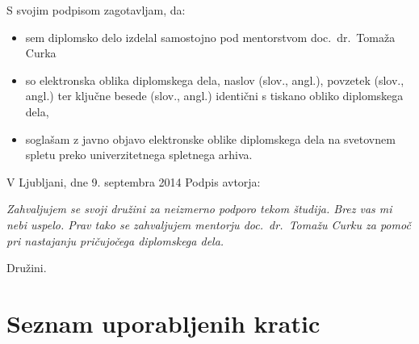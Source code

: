 \documentclass[a4paper, 12pt]{book}
\newcommand{\clearemptydoublepage}{\newpage{\pagestyle{empty}\cleardoublepage}}
\begin{document}
\vspace{1.5cm}
\noindent S svojim podpisom zagotavljam, da:
\begin{itemize}
	\item sem diplomsko delo izdelal samostojno pod mentorstvom
		doc.\ dr.\ Tomaža Curka

	\item	so elektronska oblika diplomskega dela, naslov (slov., angl.), povzetek (slov., angl.) ter ključne besede (slov., angl.) identični s tiskano obliko diplomskega dela,
	\item soglašam z javno objavo elektronske oblike diplomskega dela na svetovnem spletu preko univerzitetnega spletnega arhiva.	
\end{itemize}

\vspace{1cm}
\noindent V Ljubljani, dne 9. septembra 2014 \hfill Podpis avtorja:

\clearemptydoublepage

\thispagestyle{empty}\mbox{}\vfill\null\it%
Zahvaljujem se svoji družini za neizmerno podporo tekom študija. Brez vas mi
nebi uspelo. Prav tako se zahvaljujem mentorju doc.\ dr.\ Tomažu Curku za 
pomoč pri nastajanju pričujočega diplomskega dela. 
\rm\normalfont

\clearemptydoublepage

\thispagestyle{empty}\mbox{}{\textheight}\mbox{}\hfill\begin{minipage}{0.55\textwidth}%
Družini.
\normalfont\end{minipage}

\clearemptydoublepage

\def\thepage{}%
\setcounter{tocdepth}{3}
\tableofcontents{}


\clearemptydoublepage


\chapter*{Seznam uporabljenih kratic}
\end{document}
